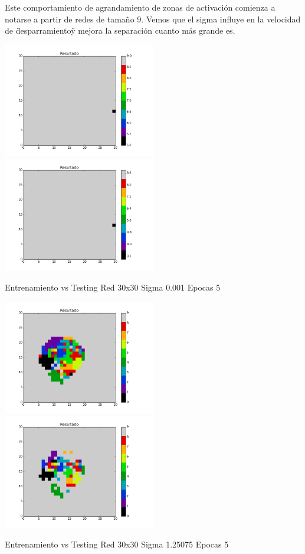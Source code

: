 Este comportamiento de agrandamiento de zonas de activaci\'on comienza a notarse a partir de redes de tama\~no 9. Vemos que el sigma influye en la velocidad de \"desparramiento\" y mejora la separaci\'on cuanto m\'as grande es.

\includegraphics[width=0.5\textwidth]{img/EJ2_Sigma/train_M_30_sigma_0_001_epocas_5}
\includegraphics[width=0.5\textwidth]{img/EJ2_Sigma/test_M_30_sigma_0_001_epocas_5}
{\center \footnotesize Entrenamiento vs Testing Red 30x30 Sigma 0.001 Epocas 5\par}

\includegraphics[width=0.5\textwidth]{img/EJ2_Sigma/train_M_30_sigma_1_25075_epocas_5}
\includegraphics[width=0.5\textwidth]{img/EJ2_Sigma/test_M_30_sigma_1_25075_epocas_5}
{\center \footnotesize Entrenamiento vs Testing Red 30x30 Sigma 1.25075 Epocas 5\par}

